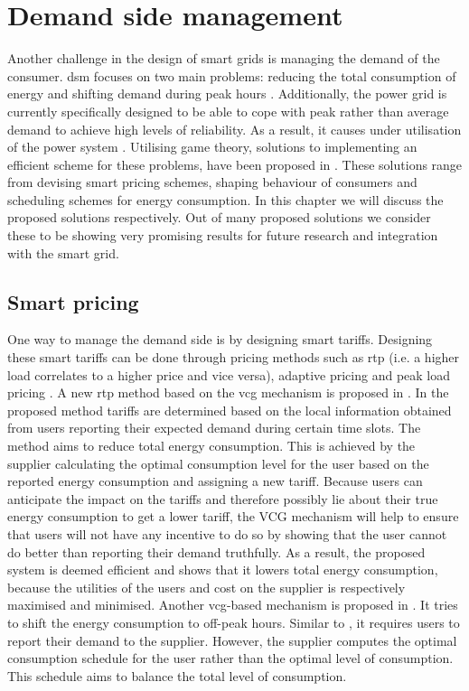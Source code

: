 \section{Demand side management}\label{dsm}
\acresetall
Another challenge in the design of smart grids is managing the demand of the consumer. \ac{dsm} focuses on two main problems: reducing the total consumption of energy and shifting demand during peak hours \cite{keypaper}. Additionally, the power grid is currently specifically designed to be able to cope with peak rather than average demand to achieve high levels of reliability. As a result, it causes under utilisation of the power system \cite{MaDengSongEtAl2014}. Utilising game theory, solutions to implementing an efficient scheme for these problems, have been proposed in \cite{SamadiMohsenian-RadSchoberEtAl2012, SamadiSchoberWong2011, MaDengSongEtAl2014, MaharjanZhuZhangEtAl2013, ChenKishoreSnyder2011, ChenLiLowEtAl2010, Mohsenian-RadWongJatskevichEtAl2010a, SalinasLiLi2013, CaronKesidis2010, DepuruWangDevabhaktuni2011a}. These solutions range from devising smart pricing schemes, shaping behaviour of consumers and scheduling schemes for energy consumption. In this chapter we will discuss the proposed solutions respectively. Out of many proposed solutions we consider these to be showing very promising results for future research and integration with the smart grid.

\subsection{Smart pricing}
One way to manage the demand side is by designing smart tariffs. Designing these smart tariffs can be done through pricing methods such as \ac{rtp} (i.e. a higher load correlates to a higher price and vice versa), adaptive pricing and peak load pricing \cite{SamadiMohsenian-RadSchoberEtAl2012}. A new \ac{rtp} method based on the \ac{vcg} mechanism is proposed in \cite{SamadiMohsenian-RadSchoberEtAl2012}. In the proposed method tariffs are determined based on the local information obtained from users reporting their expected demand during certain time slots. The method aims to reduce total energy consumption. This is achieved by the supplier calculating the optimal consumption level for the user based on the reported energy consumption and assigning a new tariff. Because users can anticipate the impact on the tariffs and therefore possibly lie about their true energy consumption to get a lower tariff, the VCG mechanism will help to ensure that users will not have any incentive to do so by showing that the user cannot do better than reporting their demand truthfully. As a result, the proposed system is deemed efficient and shows that it lowers total energy consumption, because the utilities of the users and cost on the supplier is respectively maximised and minimised. Another \ac{vcg}-based mechanism is proposed in \cite{SamadiSchoberWong2011}. It tries to shift the energy consumption to off-peak hours. Similar to \cite{SamadiMohsenian-RadSchoberEtAl2012}, it requires users to report their demand to the supplier. However, the supplier computes the optimal consumption schedule for the user rather than the optimal level of consumption. This schedule aims to balance the total level of consumption.

